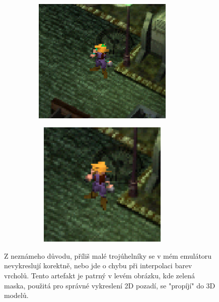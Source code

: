 \begin{figure}[hbt]
    \begin{subfigure}{0.5\textwidth}
        \centering
        \includegraphics[width=0.9\textwidth, height=6cm]{obrazky-figures/ff7-showcase-2-1.png}
    \end{subfigure}
    \begin{subfigure}{0.5\textwidth}
        \centering
        \includegraphics[width=0.9\textwidth, height=6cm]{obrazky-figures/ff7-showcase-2-2.png}
    \end{subfigure}
    \caption[Nedostatky ve hře \textit{Final Fantasy VII}]{Z neznámeho důvodu, příliš malé trojúhelníky se v mém emulátoru nevykreslují korektně, nebo jde o chybu při interpolaci barev vrcholů. Tento artefakt je
     patrný v levém obrázku, kde zelená maska, použitá pro správné vykreslení 2D pozadí, se "propíjí" do 3D modelů.}
    \label{ff7-showcase-2}
\end{figure}

